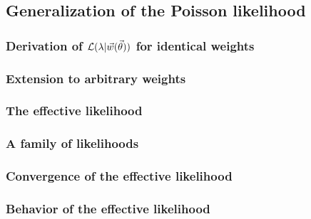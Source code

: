 \subsection{Generalization of the Poisson likelihood\label{sec:generalization_poisson}}
\begingroup
\graphicspath{{results/mcllh_paper/}}

\endgroup

\subsubsection{Derivation of $\mathcal{L} (\lambda|\vec{w}(\vec{\theta}))$ for identical weights\label{sec:constructing}}
\begingroup
\graphicspath{{results/mcllh_paper/}}

\endgroup

\subsubsection{Extension to arbitrary weights\label{sec:extending}}
\begingroup
\graphicspath{{results/mcllh_paper/}}

\endgroup

\subsubsection{The effective likelihood\label{sec:effective}}
\begingroup
\graphicspath{{results/mcllh_paper/}}

\endgroup

\subsubsection{A family of likelihoods\label{sec:priors}}
\begingroup
\graphicspath{{results/mcllh_paper/}}

\endgroup

\subsubsection{Convergence of the effective likelihood\label{sec:llhconvergence}}
\begingroup
\graphicspath{{results/mcllh_paper/}}

\endgroup

\subsubsection{Behavior of the effective likelihood\label{sec:llhbehavior}}
\begingroup
\graphicspath{{results/mcllh_paper/}}

\endgroup

